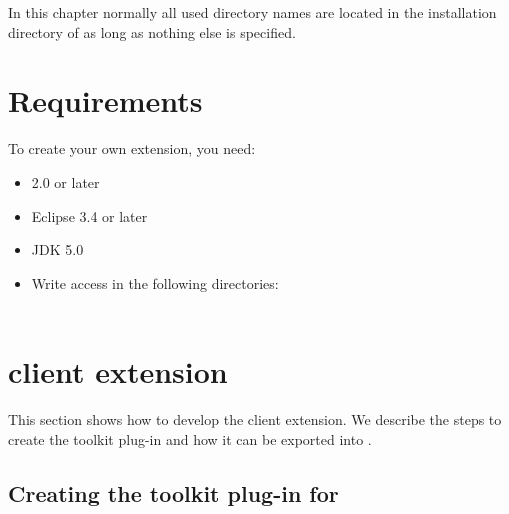 In this chapter normally all used directory names are located in the
installation directory of \app{} as long as nothing else is specified.

\section{Requirements}
To create your own \app{} extension, you need:
\begin{itemize}
\item \app{} 2.0 or later
\item Eclipse 3.4 or later
\item JDK 5.0
\item Write access in the following directories:\\
\\
\end{itemize}

\section{\app{} client extension}
\label{clientExtension}

This section shows how to develop the \app{} client extension. We describe the
steps to create the toolkit plug-in and how it can be exported into \app{}.

\subsection{Creating the toolkit plug-in for \app{}}

